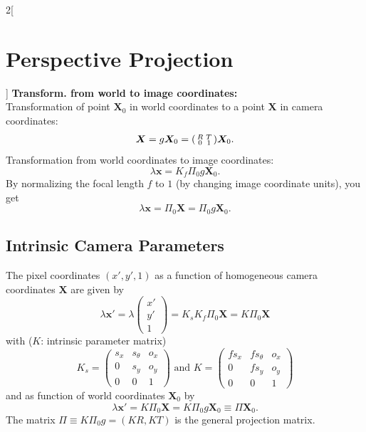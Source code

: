 \documentclass[oneside,fontsize=11pt,paper=a4]{scrartcl}
\begin{document}
\begin{multicols}{2}[\section{Perspective Projection}]
\textbf{Transform. from world to image coordinates:}\\
Transformation of point $\boldsymbol{X}_0$ in world coordinates to a point $\boldsymbol{X}$ in camera coordinates:
\begin{equation*}
	\boldsymbol{X} = g \boldsymbol{X}_0 = \begin{psmallmatrix} R & T\\0 & 1\end{psmallmatrix} \boldsymbol{X}_0.
\end{equation*}
Transformation from world coordinates to image coordinates:
\begin{equation*}
	\lambda \boldsymbol{x} = K_f \Pi_0 g \boldsymbol{X}_0.
\end{equation*}
By normalizing the focal length $f$ to $1$ (by changing image coordinate units), you get
\begin{equation*}
	\lambda \boldsymbol{x} = \Pi_0 \boldsymbol{X} = \Pi_0 g \boldsymbol{X}_0.
\end{equation*}

\subsection{Intrinsic Camera Parameters} \label{subsection:intrinsic_parameters}
The pixel coordinates $(x', y', 1)$ as a function of homogeneous camera coordinates $\boldsymbol{X}$ are given by
\begin{equation*}
	\lambda \boldsymbol{x}' = \lambda \begin{pmatrix} x'\\y'\\1 \end{pmatrix} = K_s K_f \Pi_0 \boldsymbol{X} = K \Pi_0 \boldsymbol{X}
\end{equation*}
with ($K$: intrinsic parameter matrix)
\begin{equation*}
	K_s = \begin{pmatrix} s_x & s_{\theta} & o_x\\0 & s_y & o_y\\0 & 0 & 1\end{pmatrix} \text{  and  } K = \begin{pmatrix}fs_x & fs_{\theta} & o_x\\0 & fs_y & o_y\\0 & 0 & 1 \end{pmatrix}
\end{equation*}
and as function of world coordinates $\boldsymbol{X}_0$ by
\begin{equation*}
	\lambda \boldsymbol{x}' = K \Pi_0 \boldsymbol{X} = K \Pi_0 g \boldsymbol{X}_0 \equiv \Pi \boldsymbol{X}_0.
\end{equation*}
The matrix $\Pi \equiv K \Pi_0 g = (KR,KT)$ is the general projection matrix.\par
\vspace{4mm}


\end{multicols}
\end{document}
